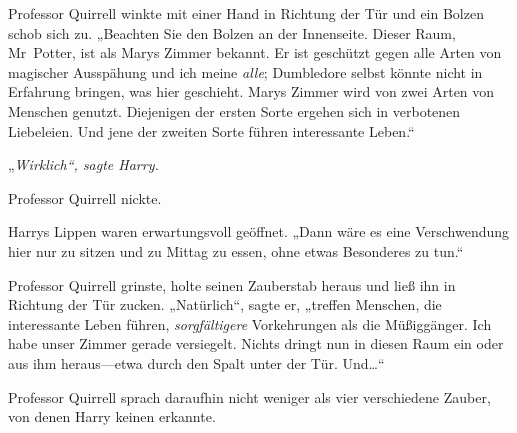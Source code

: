 Professor Quirrell winkte mit einer Hand in Richtung der Tür und ein Bolzen schob sich zu. „Beachten Sie den Bolzen an der Innenseite. Dieser Raum, Mr~Potter, ist als Marys Zimmer bekannt. Er ist geschützt gegen alle Arten von magischer Ausspähung und ich meine \emph{alle}; Dumbledore selbst könnte nicht in Erfahrung bringen, was hier geschieht. Marys Zimmer wird von zwei Arten von Menschen genutzt. Diejenigen der ersten Sorte ergehen sich in verbotenen Liebeleien. Und jene der zweiten Sorte führen interessante Leben.“

„\emph{Wirklich“, sagte Harry.}

Professor Quirrell nickte.

Harrys Lippen waren erwartungsvoll geöffnet. „Dann wäre es eine Verschwendung hier nur zu sitzen und zu Mittag zu essen, ohne etwas Besonderes zu tun.“

Professor Quirrell grinste, holte seinen Zauberstab heraus und ließ ihn in Richtung der Tür zucken. „Natürlich“, sagte er, „treffen Menschen, die interessante Leben führen, \emph{sorgfältigere} Vorkehrungen als die Müßiggänger. Ich habe unser Zimmer gerade versiegelt. Nichts dringt nun in diesen Raum ein oder aus ihm heraus—etwa durch den Spalt unter der Tür. Und…“

Professor Quirrell sprach daraufhin nicht weniger als vier verschiedene Zauber, von denen Harry keinen erkannte.

